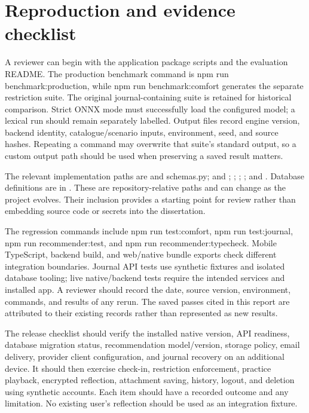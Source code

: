 \section{Reproduction and evidence checklist}

A reviewer can begin with the application package scripts and the evaluation README. The production benchmark command is npm run benchmark:production, while npm run benchmark:comfort generates the separate restriction suite. The original journal-containing suite is retained for historical comparison. Strict ONNX mode must successfully load the configured model; a lexical run should remain separately labelled. Output files record engine version, backend identity, catalogue/\allowbreak{}scenario inputs, environment, seed, and source hashes. Repeating a command may overwrite that suite's standard output, so a custom output path should be used when preserving a saved result matters.

The relevant implementation paths are  and schemas.py;  and ; ; ; ; and . Database definitions are in . These are repository-relative paths and can change as the project evolves. Their inclusion provides a starting point for review rather than embedding source code or secrets into the dissertation.

The regression commands include npm run test:comfort, npm run test:journal, npm run recommender:test, and npm run recommender:typecheck. Mobile TypeScript, backend build, and web/\allowbreak{}native bundle exports check different integration boundaries. Journal API tests use synthetic fixtures and isolated database tooling; live native/\allowbreak{}backend tests require the intended services and installed app. A reviewer should record the date, source version, environment, commands, and results of any rerun. The saved passes cited in this report are attributed to their existing records rather than represented as new results.

The release checklist should verify the installed native version, API readiness, database migration status, recommendation model/\allowbreak{}version, storage policy, email delivery, provider client configuration, and journal recovery on an additional device. It should then exercise check-in, restriction enforcement, practice playback, encrypted reflection, attachment saving, history, logout, and deletion using synthetic accounts. Each item should have a recorded outcome and any limitation. No existing user's reflection should be used as an integration fixture.
